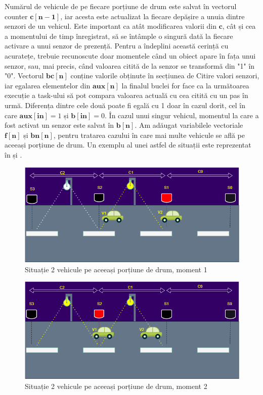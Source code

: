 Numărul de vehicule de pe fiecare porțiune de drum este salvat în vectorul counter $\mathbf{c[n - 1]}$, iar acesta este actualizat la fiecare depășire a unuia dintre senzori de un vehicul. Este important ca atât modificarea valorii din $\mathbf{c}$, cât și cea a momentului de timp înregistrat, să se întâmple o singură dată la fiecare activare a unui senzor de prezență. Pentru a îndeplini această cerință cu acuratețe, trebuie recunoscute doar momentele când un obiect apare în fața unui senzor, sau, mai precis, când valoarea citită de la senzor se transformă din "1" în "0". Vectorul $\mathbf{bc[n]}$ conține valorile obținute în secțiunea de Citire valori senzori, iar egalarea elementelor din $\mathbf{aux[n]}$ la finalul buclei for face ca la următoarea execuție a task-ului să pot compara valoarea actuală cu cea citită cu un pas în urmă. Diferența dintre cele două poate fi egală cu 1 doar în cazul dorit, cel în care $\mathbf{aux[in]}=1$ și $\mathbf{b[in]}=0$. În cazul unui singur vehicul,  momentul la care a fost activat un senzor este salvat în $\mathbf{b[n]}$. Am adăugat variabilele vectoriale $\mathbf{f[n]}$ și $\mathbf{bn[n]}$, pentru tratarea cazului în care mai multe vehicule se află pe aceeași porțiune de drum. Un exemplu al unei astfel de situații este reprezentat în  și  .
\begin{figure}[!ht]
    \begin{center}
    \includegraphics[width=0.7\linewidth,keepaspectratio]{pics/doi1.png}
    \end{center}
    \caption{Situație 2 vehicule pe aceeași porțiune de drum, moment 1}
    \label{fig:doi1}
\end{figure}

\begin{figure}[!ht]
    \begin{center}
    \includegraphics[width=0.7\linewidth,keepaspectratio]{pics/doi2.png}
    \end{center}
    \caption{Situație 2 vehicule pe aceeași porțiune de drum, moment 2}
    \label{fig:doi2}
\end{figure}

